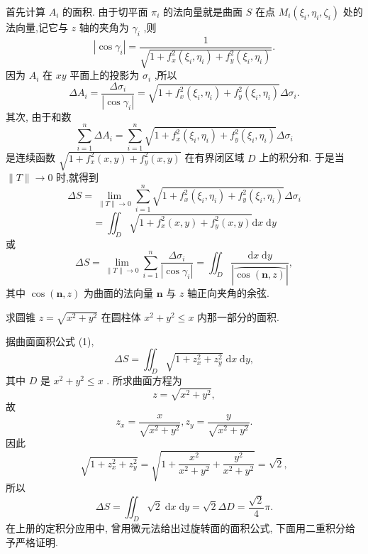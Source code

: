 首先计算 \({A}_{i}\) 的面积. 由于切平面 \({\pi }_{i}\) 的法向量就是曲面 \(S\) 在点 \({M}_{i}\left( {{\xi }_{i},{\eta }_{i},{\zeta }_{i}}\right)\) 处的法向量,记它与 \(z\) 轴的夹角为 \({\gamma }_{i}\) ,则
\[
\left| {\cos {\gamma }_{i}}\right|  = \frac{1}{\sqrt{1 + {f}_{x}^{2}\left( {{\xi }_{i},{\eta }_{i}}\right)  + {f}_{y}^{2}\left( {{\xi }_{i},{\eta }_{i}}\right) }}.
\]
因为 \({A}_{i}\) 在 \({xy}\) 平面上的投影为 \({\sigma }_{i}\) ,所以
\[
\Delta {A}_{i} = \frac{\Delta {\sigma }_{i}}{\left| \cos {\gamma }_{i}\right| } = \sqrt{1 + {f}_{x}^{2}\left( {{\xi }_{i},{\eta }_{i}}\right)  + {f}_{y}^{2}\left( {{\xi }_{i},{\eta }_{i}}\right) }\Delta {\sigma }_{i}.
\]
其次, 由于和数
\[
\mathop{\sum }\limits_{{i = 1}}^{n}\Delta {A}_{i} = \mathop{\sum }\limits_{{i = 1}}^{n}\sqrt{1 + {f}_{x}^{2}\left( {{\xi }_{i},{\eta }_{i}}\right)  + {f}_{y}^{2}\left( {{\xi }_{i},{\eta }_{i}}\right) }\Delta {\sigma }_{i}
\]
是连续函数 \(\sqrt{1 + {f}_{x}^{2}\left( {x,y}\right)  + {f}_{y}^{2}\left( {x,y}\right) }\) 在有界闭区域 \(D\) 上的积分和. 于是当 \(\parallel T\parallel  \rightarrow  0\) 时,就得到
\[
{\Delta S} = \mathop{\lim }\limits_{{\parallel T\parallel  \rightarrow  0}}\mathop{\sum }\limits_{{i = 1}}^{n}\sqrt{1 + {f}_{x}^{2}\left( {{\xi }_{i},{\eta }_{i}}\right)  + {f}_{y}^{2}\left( {{\xi }_{i},{\eta }_{i}}\right) }\Delta {\sigma }_{i}
\]
\[
= {\iint }_{D}\sqrt{1 + {f}_{x}^{2}\left( {x,y}\right)  + {f}_{y}^{2}\left( {x,y}\right) }\mathrm{d}x\mathrm{\;d}y \tag{1}
\]
或
\[
{\Delta S} = \mathop{\lim }\limits_{{\parallel T\parallel  \rightarrow  0}}\mathop{\sum }\limits_{{i = 1}}^{n}\frac{\Delta {\sigma }_{i}}{\left| \cos {\gamma }_{i}\right| } = {\iint }_{D}\frac{\mathrm{d}x\mathrm{\;d}y}{\left| \overset{⏜}{\cos \left( {\mathbf{n},z}\right) }\right| }, \tag{2}
\]
其中 \(\cos \left( {\mathbf{n},z}\right)\) 为曲面的法向量 \(\mathbf{n}\) 与 \(z\) 轴正向夹角的余弦.

\begin{example}

\end{example}
求圆锥 \(z = \sqrt{{x}^{2} + {y}^{2}}\) 在圆柱体 \({x}^{2} + {y}^{2} \leq  x\) 内那一部分的面积.

\begin{solution}

\end{solution}
据曲面面积公式 (1),
\[
{\Delta S} = {\iint }_{D}\sqrt{1 + {z}_{x}^{2} + {z}_{y}^{2}}\mathrm{\;d}x\mathrm{\;d}y,
\]
其中 \(D\) 是 \({x}^{2} + {y}^{2} \leq  x\) . 所求曲面方程为
\[
z = \sqrt{{x}^{2} + {y}^{2}},
\]
故
\[
{z}_{x} = \frac{x}{\sqrt{{x}^{2} + {y}^{2}}},{z}_{y} = \frac{y}{\sqrt{{x}^{2} + {y}^{2}}}.
\]
因此
\[
\sqrt{1 + {z}_{x}^{2} + {z}_{y}^{2}} = \sqrt{1 + \frac{{x}^{2}}{{x}^{2} + {y}^{2}} + \frac{{y}^{2}}{{x}^{2} + {y}^{2}}} = \sqrt{2},
\]
所以
\[
{\Delta S} = {\iint }_{D}\sqrt{2}\mathrm{\;d}x\mathrm{\;d}y = \sqrt{2}{\Delta D} = \frac{\sqrt{2}}{4}\pi .
\]
在上册的定积分应用中, 曾用微元法给出过旋转面的面积公式, 下面用二重积分给予严格证明.


